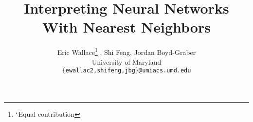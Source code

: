 \documentclass[11pt,a4paper]{article}
\title{Interpreting Neural Networks With Nearest Neighbors}
\author{Eric Wallace\thanks{$^{\star}$Equal contribution} , Shi Feng\printfnsymbol{1}, Jordan Boyd-Graber\\
University of Maryland \\
  {\tt \{ewallac2,shifeng,jbg\}@umiacs.umd.edu} \\}
\date{}
\begin{document}
\maketitle

\begin{abstract}
    
\end{abstract}












\end{document}
